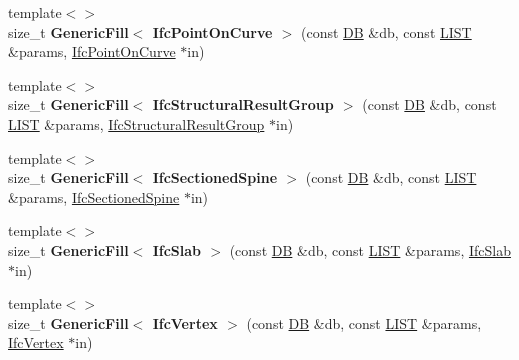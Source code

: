 \begin{DoxyCompactItemize}
\item 
\hypertarget{namespace_assimp_1_1_s_t_e_p_a814393edf1fa736bd75cf9e3ae087bdc}{{\footnotesize template$<$$>$ }\\size\+\_\+t {\bfseries Generic\+Fill$<$ Ifc\+Point\+On\+Curve $>$} (const \hyperlink{class_assimp_1_1_s_t_e_p_1_1_d_b}{D\+B} \&db, const \hyperlink{class_assimp_1_1_s_t_e_p_1_1_e_x_p_r_e_s_s_1_1_l_i_s_t}{L\+I\+S\+T} \&params, \hyperlink{struct_assimp_1_1_i_f_c_1_1_ifc_point_on_curve}{Ifc\+Point\+On\+Curve} $\ast$in)}\label{namespace_assimp_1_1_s_t_e_p_a814393edf1fa736bd75cf9e3ae087bdc}

\item 
\hypertarget{namespace_assimp_1_1_s_t_e_p_a0ed7667d309a54e7ca1288695aad940f}{{\footnotesize template$<$$>$ }\\size\+\_\+t {\bfseries Generic\+Fill$<$ Ifc\+Structural\+Result\+Group $>$} (const \hyperlink{class_assimp_1_1_s_t_e_p_1_1_d_b}{D\+B} \&db, const \hyperlink{class_assimp_1_1_s_t_e_p_1_1_e_x_p_r_e_s_s_1_1_l_i_s_t}{L\+I\+S\+T} \&params, \hyperlink{struct_assimp_1_1_i_f_c_1_1_ifc_structural_result_group}{Ifc\+Structural\+Result\+Group} $\ast$in)}\label{namespace_assimp_1_1_s_t_e_p_a0ed7667d309a54e7ca1288695aad940f}

\item 
\hypertarget{namespace_assimp_1_1_s_t_e_p_a1c85c4c5c1e2a8749e6e2a32bbd3557d}{{\footnotesize template$<$$>$ }\\size\+\_\+t {\bfseries Generic\+Fill$<$ Ifc\+Sectioned\+Spine $>$} (const \hyperlink{class_assimp_1_1_s_t_e_p_1_1_d_b}{D\+B} \&db, const \hyperlink{class_assimp_1_1_s_t_e_p_1_1_e_x_p_r_e_s_s_1_1_l_i_s_t}{L\+I\+S\+T} \&params, \hyperlink{struct_assimp_1_1_i_f_c_1_1_ifc_sectioned_spine}{Ifc\+Sectioned\+Spine} $\ast$in)}\label{namespace_assimp_1_1_s_t_e_p_a1c85c4c5c1e2a8749e6e2a32bbd3557d}

\item 
\hypertarget{namespace_assimp_1_1_s_t_e_p_a012c697ebd244546501e5ad7a5146776}{{\footnotesize template$<$$>$ }\\size\+\_\+t {\bfseries Generic\+Fill$<$ Ifc\+Slab $>$} (const \hyperlink{class_assimp_1_1_s_t_e_p_1_1_d_b}{D\+B} \&db, const \hyperlink{class_assimp_1_1_s_t_e_p_1_1_e_x_p_r_e_s_s_1_1_l_i_s_t}{L\+I\+S\+T} \&params, \hyperlink{struct_assimp_1_1_i_f_c_1_1_ifc_slab}{Ifc\+Slab} $\ast$in)}\label{namespace_assimp_1_1_s_t_e_p_a012c697ebd244546501e5ad7a5146776}

\item 
\hypertarget{namespace_assimp_1_1_s_t_e_p_a1fa50999d19983f1fbc64dbea984ea17}{{\footnotesize template$<$$>$ }\\size\+\_\+t {\bfseries Generic\+Fill$<$ Ifc\+Vertex $>$} (const \hyperlink{class_assimp_1_1_s_t_e_p_1_1_d_b}{D\+B} \&db, const \hyperlink{class_assimp_1_1_s_t_e_p_1_1_e_x_p_r_e_s_s_1_1_l_i_s_t}{L\+I\+S\+T} \&params, \hyperlink{struct_assimp_1_1_i_f_c_1_1_ifc_vertex}{Ifc\+Vertex} $\ast$in)}\label{namespace_assimp_1_1_s_t_e_p_a1fa50999d19983f1fbc64dbea984ea17}


\end{DoxyCompactItemize}
